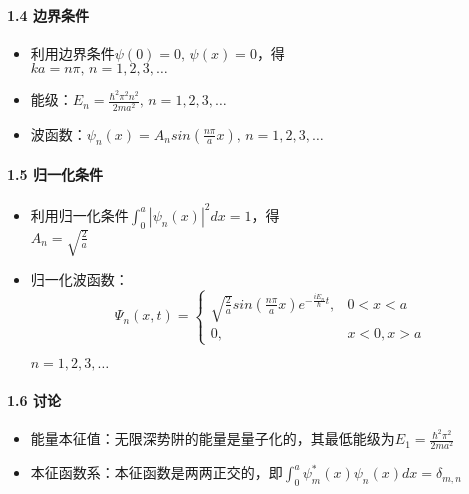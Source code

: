 \documentclass[UTF8,twocolumn]{ctexart}
\providecommand{\tightlist}{%
  \setlength{\itemsep}{0pt}\setlength{\parskip}{0pt}}
\let\oldparagraph\paragraph
\renewcommand{\paragraph}[1]{\oldparagraph{#1}\mbox{}}
\begin{document}
\hypertarget{ux8fb9ux754cux6761ux4ef6}{%
\paragraph{{ }1.4 边界条件}\label{ux8fb9ux754cux6761ux4ef6}}

\begin{itemize}
\tightlist
\item
  利用边界条件\(\psi(0)=0,\,\psi(x)=0\)，得\\\(ka=n\pi,\,n=1,2,3,\ldots\)
\item
  能级：\(E_n=\frac{\hbar^2\pi^2n^2}{2ma^2},\,n=1,2,3,\ldots\)
\item
  波函数：\(\psi_n(x)=A_nsin(\frac{n\pi}{a}x),\,n=1,2,3,\ldots\)
\end{itemize}

\hypertarget{ux5f52ux4e00ux5316ux6761ux4ef6}{%
\paragraph{{ }1.5 归一化条件}\label{ux5f52ux4e00ux5316ux6761ux4ef6}}

\begin{itemize}
\tightlist
\item
  利用归一化条件\(\int_0^a|\psi_n(x)|^2dx=1\)，得\\\(A_n=\sqrt{\frac{2}{a}}\)
\item
  归一化波函数： \[\Psi_n(x,t)=\begin{cases} 
        \sqrt{\frac{2}{a}}sin(\frac{n\pi}{a}x)e^{-\frac{iE_n}{\hbar}t}, & 0<x<a\\
        0, & x<0,x>a
  \end{cases}\]
  \begin{center}
    \(n=1,2,3,\ldots\)
  \end{center}
\end{itemize}

\hypertarget{ux8ba8ux8bba-2}{%
\paragraph{{ }1.6 讨论}\label{ux8ba8ux8bba-2}}

\begin{itemize}
\tightlist
\item
  能量本征值：无限深势阱的能量是量子化的，其最低能级为\(E_1=\frac{\hbar^2\pi^2}{2ma^2}\)
\item
  本征函数系：本征函数是两两正交的，即\(\int_0^a\psi_m^*(x)\psi_n(x)dx=\delta_{m,n}\)
\end{itemize}
\end{document}
